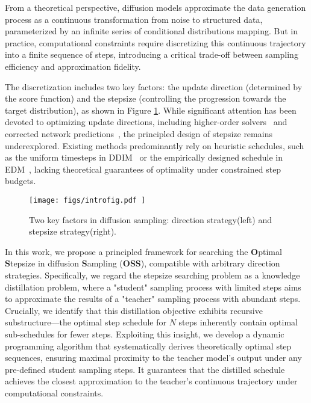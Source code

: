\documentclass[10pt,twocolumn,letterpaper]{article}
\begin{document}
    From a theoretical perspective, diffusion models approximate the data generation process as a continuous transformation from noise to structured data, parameterized by an infinite series of conditional distributions mapping. But in practice, computational constraints require discretizing this continuous trajectory into a finite sequence of steps, introducing a critical trade-off between sampling efficiency and approximation fidelity. 
    
    

    The discretization includes two key factors: the update direction (determined by the score function) and the stepsize (controlling the progression towards the target distribution), as shown in Figure \ref{fig:introfig}. While significant attention has been devoted to optimizing update directions, including higher-order solvers~\cite{dpm,dpm++} and corrected network predictions~\cite{unipc}, the principled design of stepsize remains underexplored. Existing methods predominantly rely on heuristic schedules, such as the uniform timesteps in DDIM~\cite{ddim} or the empirically designed schedule in EDM~\cite{edm}, lacking theoretical guarantees of optimality under constrained step budgets.

    

    \begin{figure}
    \vspace{-0.6cm}
        \centering
        \texttt{[image: 
            figs/introfig.pdf
        ]}
        \vspace{-0.6cm}
        \caption{Two key factors in diffusion sampling: direction strategy(left) and stepsize strategy(right).}
        \label{fig:introfig}
        \vspace{-0.6cm}
    \end{figure}


    
    In this work, we propose a principled framework for searching the \textbf{O}ptimal \textbf{S}tepsize in diffusion \textbf{S}ampling (\textbf{OSS}), compatible with arbitrary direction strategies. Specifically, we regard the stepsize searching problem as a knowledge distillation problem, where a "student" sampling process with limited steps aims to approximate the results of a "teacher" sampling process with abundant steps. Crucially, we identify that this distillation objective exhibits recursive substructure—the optimal step schedule for $N$ steps inherently contain optimal sub-schedules for fewer steps. Exploiting this insight, we develop a dynamic programming algorithm that systematically derives theoretically optimal step sequences, ensuring maximal proximity to the teacher model's output under any pre-defined student sampling steps. It guarantees that the distilled schedule achieves the closest approximation to the teacher's continuous trajectory under computational constraints.
\end{document}

